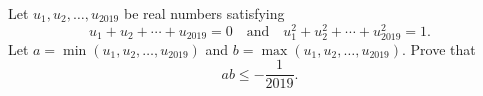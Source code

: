 Let $u_1, u_2, \ldots, u_{2019}$ be real numbers satisfying
\[ u_1 + u_2 + \cdots + u_{2019} = 0 \quad \text{and} \quad u_1^2 + u_2^2 + \cdots + u_{2019}^2 = 1. \]
Let $a = \min(u_1, u_2, \ldots, u_{2019})$ and $b = \max(u_1, u_2, \ldots, u_{2019})$. Prove that
\[ ab \leq -\frac{1}{2019}. \]

